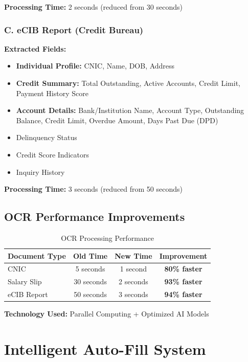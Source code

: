\documentclass[12pt,a4paper]{article}
\begin{document}
\textbf{Processing Time:} 2 seconds (reduced from 30 seconds)

\subsubsection{C. eCIB Report (Credit Bureau)}

\textbf{Extracted Fields:}
\begin{itemize}[noitemsep]
    \item \textbf{Individual Profile:} CNIC, Name, DOB, Address
    \item \textbf{Credit Summary:} Total Outstanding, Active Accounts, Credit Limit, Payment History Score
    \item \textbf{Account Details:} Bank/Institution Name, Account Type, Outstanding Balance, Credit Limit, Overdue Amount, Days Past Due (DPD)
    \item Delinquency Status
    \item Credit Score Indicators
    \item Inquiry History
\end{itemize}

\textbf{Processing Time:} 3 seconds (reduced from 50 seconds)

\subsection{OCR Performance Improvements}

\begin{table}[h]
\centering
\begin{tabular}{@{}lccc@{}}
\toprule
\textbf{Document Type} & \textbf{Old Time} & \textbf{New Time} & \textbf{Improvement} \\ \midrule
CNIC & 5 seconds & 1 second & \textbf{80\% faster} \\
Salary Slip & 30 seconds & 2 seconds & \textbf{93\% faster} \\
eCIB Report & 50 seconds & 3 seconds & \textbf{94\% faster} \\ \bottomrule
\end{tabular}
\caption{OCR Processing Performance}
\end{table}

\textbf{Technology Used:} Parallel Computing + Optimized AI Models

\newpage

\section{Intelligent Auto-Fill System}
\end{document}
